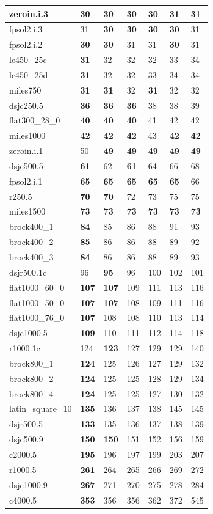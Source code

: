 \documentclass[12pt,a4paper,twoside]{scrartcl}
\numberwithin{equation}{section}
\begin{document}
\begin{table}[h!]
\begin{tabular}{|p{3cm} |p{1cm} p{1cm} p{1cm} p{1cm} p{1cm} p{1cm}|}
zeroin.i.3&\textbf{30}&\textbf{30}&\textbf{30}&\textbf{30}&31&31\\ \hline
fpsol2.i.3&31&\textbf{30}&\textbf{30}&\textbf{30}&\textbf{30}&31\\ 
fpsol2.i.2&\textbf{30}&\textbf{30}&31&31&\textbf{30}&31\\
le450\_25c&\textbf{31}&32&32&32&33&34\\ 
le450\_25d&\textbf{31}&32&32&33&34&34\\ 
miles750&\textbf{31}&\textbf{31}&32&\textbf{31}&32&32\\ \hline
dsjc250.5&\textbf{36}&\textbf{36}&\textbf{36}&38&38&39\\ 
flat300\_28\_0&\textbf{40}&\textbf{40}&\textbf{40}&41&42&42\\ 
miles1000&\textbf{42}&\textbf{42}&\textbf{42}&43&\textbf{42}&\textbf{42}\\
zeroin.i.1&50&\textbf{49}&\textbf{49}&\textbf{49}&\textbf{49}&\textbf{49}\\ 
dsjc500.5&\textbf{61}&62&\textbf{61}&64&66&68\\ \hline
fpsol2.i.1&\textbf{65}&\textbf{65}&\textbf{65}&\textbf{65}&\textbf{65}&66\\ 
r250.5&\textbf{70}&\textbf{70}&72&73&75&75\\ 
miles1500&\textbf{73}&\textbf{73}&\textbf{73}&\textbf{73}&\textbf{73}&\textbf{73}\\ 
brock400\_1&\textbf{84}&85&86&88&91&93\\ 
brock400\_2&\textbf{85}&86&86&88&89&92\\ \hline
brock400\_3&\textbf{84}&86&86&88&89&93\\ 
dsjr500.1c&96&\textbf{95}&96&100&102&101\\ 
flat1000\_60\_0&\textbf{107}&\textbf{107}&109&111&113&116\\
flat1000\_50\_0&\textbf{107}&\textbf{107}&108&109&111&116\\
flat1000\_76\_0&\textbf{107}&108&108&110&113&114\\ \hline
dsjc1000.5&\textbf{109}&110&111&112&114&118\\ 
r1000.1c&124&\textbf{123}&127&129&129&140\\ 
brock800\_1&\textbf{124}&125&126&127&129&132\\ 
brock800\_2&\textbf{124}&125&125&128&129&134\\ 
brock800\_4&\textbf{124}&125&125&127&130&132\\ \hline
latin\_square\_10&\textbf{135}&136&137&138&145&145\\ 
dsjr500.5&\textbf{133}&135&136&137&138&139\\
dsjc500.9&\textbf{150}&\textbf{150}&151&152&156&159\\ 
c2000.5&\textbf{195}&196&197&199&203&207\\ 
r1000.5&\textbf{261}&264&265&266&269&272\\ \hline
dsjc1000.9&\textbf{267}&271&270&275&278&284\\
c4000.5&\textbf{353}&356&356&362&372&545\\ \hline
\end{tabular}
\end{table}
\clearpage
\end{document}
